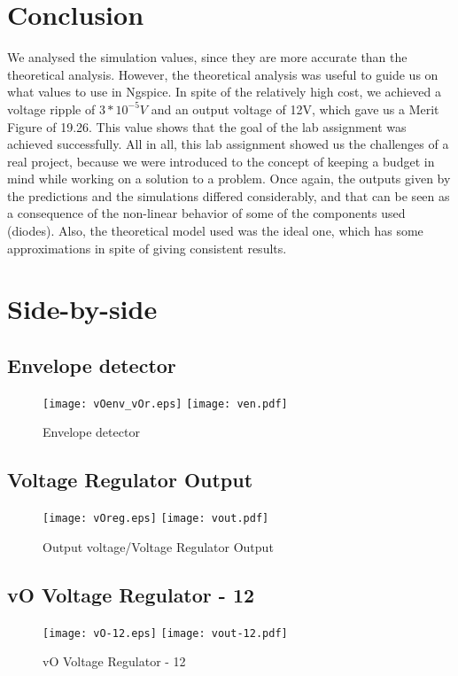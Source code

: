 \section{Conclusion}
\label{sec:conclusion}
We analysed the simulation values, since they are more accurate than the theoretical analysis. However, the theoretical analysis was useful to guide us on what values to use in Ngspice. In spite of the relatively high cost, we achieved a voltage ripple of $3*10^{-5}V$ and an output voltage of 12V, which gave us a Merit Figure of 19.26.  This value shows that the goal of the lab assignment was achieved successfully.
All in all, this lab assignment showed us the challenges of a real project, because we were introduced to the concept of keeping a budget in mind while working on a solution to a problem. Once again, the outputs given by the predictions and the simulations differed considerably, and that can be seen as a consequence of the non-linear behavior of some of the components used (diodes). Also, the theoretical model used was the ideal one, which has some approximations in spite of giving consistent results.
\clearpage

\section{Side-by-side}
\label{sec:side-by-side}

\subsection{Envelope detector}
\begin{figure}[h] \centering
\texttt{[image: vOenv\_vOr.eps]}
\texttt{[image: ven.pdf]}
\caption{Envelope detector}
\label{fig:comparison1}
\end{figure}
\FloatBarrier

\subsection{Voltage Regulator Output}
\begin{figure}[h] \centering
\texttt{[image: vOreg.eps]}
\texttt{[image: vout.pdf]}
\caption{Output voltage/Voltage Regulator Output}
\label{fig:comparison2}
\end{figure}
\FloatBarrier
\pagebreak

\subsection{vO Voltage Regulator - 12}
\begin{figure}[h] \centering
\texttt{[image: vO-12.eps]}
\texttt{[image: vout-12.pdf]}
\caption{vO Voltage Regulator - 12}
\label{fig:comparison3}
\end{figure}
\FloatBarrier
